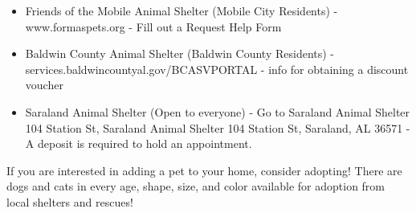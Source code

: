 \documentclass[
]{book}
\providecommand{\tightlist}{%
  \setlength{\itemsep}{0pt}\setlength{\parskip}{0pt}}
\begin{document}
\begin{itemize}
\tightlist
\item
  Friends of the Mobile Animal Shelter (Mobile City Residents) - www.formaspets.org - Fill out a Request Help Form
\item
  Baldwin County Animal Shelter (Baldwin County Residents) - services.baldwincountyal.gov/BCASVPORTAL - info for obtaining a discount voucher
\item
  Saraland Animal Shelter (Open to everyone) - Go to Saraland Animal Shelter 104 Station St, Saraland Animal Shelter 104 Station St, Saraland, AL 36571 - A deposit is required to hold an appointment.
\end{itemize}

If you are interested in adding a pet to your home, consider adopting! There are dogs and cats in every age, shape, size, and color available for adoption from local shelters and rescues!


\end{document}
